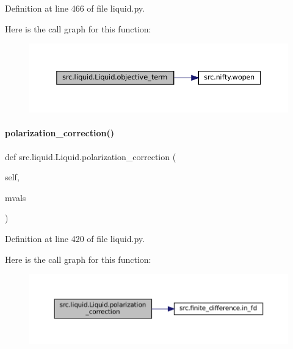 Definition at line 466 of file liquid.\+py.

Here is the call graph for this function\+:
\nopagebreak
\begin{figure}[H]
\begin{center}
\leavevmode
\includegraphics[width=350pt]{classsrc_1_1liquid_1_1Liquid_ac5a5a9186569e177bf69563dd2b08e80_cgraph}
\end{center}
\end{figure}
\mbox{\label{classsrc_1_1liquid_1_1Liquid_a4d42de04975d1fac3a958bb943cc1250}} 
\paragraph{\texorpdfstring{polarization\+\_\+correction()}{polarization\_correction()}}
{\footnotesize\ttfamily def src.\+liquid.\+Liquid.\+polarization\+\_\+correction (\begin{DoxyParamCaption}\item[{}]{self,  }\item[{}]{mvals }\end{DoxyParamCaption})}



Definition at line 420 of file liquid.\+py.

Here is the call graph for this function\+:
\nopagebreak
\begin{figure}[H]
\begin{center}
\leavevmode
\includegraphics[width=350pt]{classsrc_1_1liquid_1_1Liquid_a4d42de04975d1fac3a958bb943cc1250_cgraph}
\end{center}
\end{figure}
\mbox{\label{classsrc_1_1liquid_1_1Liquid_a8ded8861b18852faa19ce5193691f1f6}} 
